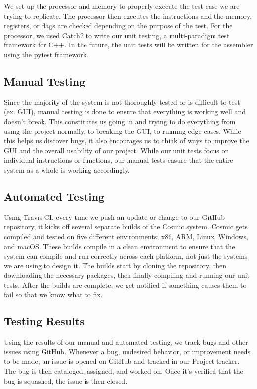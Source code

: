 \documentclass[conference]{IEEEtran}
\begin{document}
We set up the processor and memory to properly execute the test case we are trying to replicate. The processor then executes the instructions and the memory, registers, or flags are checked depending on the purpose of the test. For the processor, we used Catch2 to write our unit testing, a multi-paradigm test framework for C++. In the future, the unit tests will be written for the assembler using the pytest framework.

\subsection{Manual Testing}
Since the majority of the system is not thoroughly tested or is difficult to test (ex. GUI), manual testing is done to ensure that everything is working well and doesn't break. This constitutes us going in and trying to do everything from using the project normally, to breaking the GUI, to running edge cases. While this helps us discover bugs, it also encourages us to think of ways to improve the GUI and the overall usability of our project. While our unit tests focus on individual instructions or functions, our manual tests ensure that the entire system as a whole is working accordingly.

\subsection{Automated Testing}
Using Travis CI, every time we push an update or change to our GitHub repository, it kicks off several separate builds of the Cosmic system. Cosmic gets compiled and tested on five different environments; x86, ARM, Linux, Windows, and macOS. These builds compile in a clean environment to ensure that the system can compile and run correctly across each platform, not just the systems we are using to design it. The builds start by cloning the repository, then downloading the necessary packages, then finally compiling and running our unit tests. After the builds are complete, we get notified if something causes them to fail so that we know what to fix.

\subsection{Testing Results}
Using the results of our manual and automated testing, we track bugs and other issues using GitHub. Whenever a bug, undesired behavior, or improvement needs to be made, an issue is opened on GitHub and tracked in our Project tracker. The bug is then cataloged, assigned, and worked on. Once it's verified that the bug is squashed, the issue is then closed.
\end{document}
